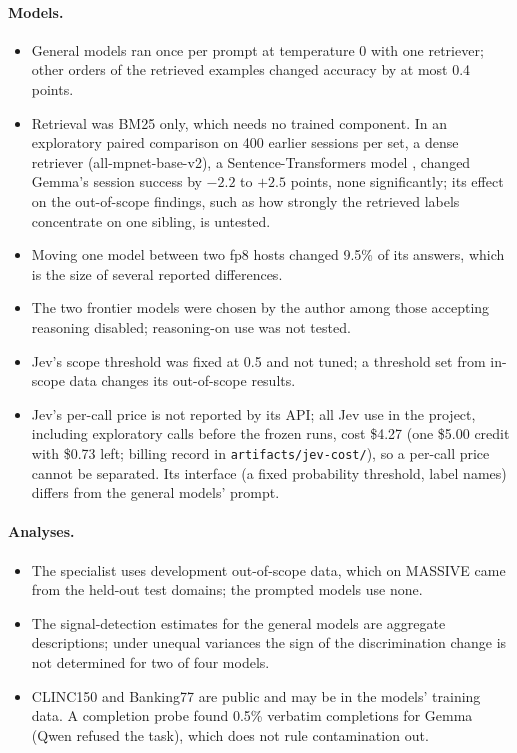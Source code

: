 \documentclass[11pt]{article}
\begin{document}
\paragraph{Models.}
\begin{itemize}
  \item General models ran once per prompt at temperature 0 with one retriever; other orders of the retrieved examples changed accuracy by at most 0.4 points.
  \item Retrieval was BM25 only, which needs no trained component. In an exploratory paired comparison on 400 earlier sessions per set, a dense retriever (all-mpnet-base-v2), a Sentence-Transformers model \citep{reimers2019sbert}, changed Gemma's session success by $-2.2$ to $+2.5$ points, none significantly; its effect on the out-of-scope findings, such as how strongly the retrieved labels concentrate on one sibling, is untested.
  \item Moving one model between two fp8 hosts changed 9.5\% of its answers, which is the size of several reported differences.
  \item The two frontier models were chosen by the author among those accepting reasoning disabled; reasoning-on use was not tested.
  \item Jev's scope threshold was fixed at 0.5 and not tuned; a threshold set from in-scope data changes its out-of-scope results.
  \item Jev's per-call price is not reported by its API; all Jev use in the project, including exploratory calls before the frozen runs, cost \$4.27 (one \$5.00 credit with \$0.73 left; billing record in \texttt{artifacts/jev-cost/}), so a per-call price cannot be separated. Its interface (a fixed probability threshold, label names) differs from the general models' prompt.
\end{itemize}

\paragraph{Analyses.}
\begin{itemize}
  \item The specialist uses development out-of-scope data, which on MASSIVE came from the held-out test domains; the prompted models use none.
  \item The signal-detection estimates for the general models are aggregate descriptions; under unequal variances the sign of the discrimination change is not determined for two of four models.
  \item CLINC150 and Banking77 are public and may be in the models' training data. A completion probe found 0.5\% verbatim completions for Gemma (Qwen refused the task), which does not rule contamination out.
\end{itemize}
\end{document}
